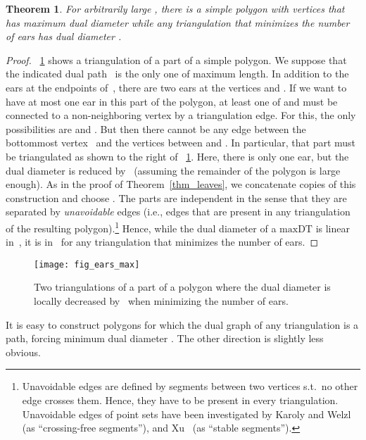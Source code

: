 \documentclass{article}
\newcommand{\MaxDT}{\ensuremath{\mathrm{maxDT}}}
\newtheorem{theorem}{Theorem}[section]
\begin{document}
\begin{theorem}
For arbitrarily large , there 
is a simple polygon with  vertices that has maximum dual diameter
 while any triangulation
that minimizes the number of 
ears has dual diameter . 
\end{theorem}
\begin{proof}
\figurename~\ref{fig:fig_ears_max} shows a triangulation of a part 
of a simple polygon.
We suppose that the indicated dual path~ is the only one of maximum 
length.
In addition to the ears at the endpoints of~, there are two ears at 
the vertices  and .
If we want to have at most one ear in this part of the polygon,
at least one of  and  must be connected to a 
non-neighboring vertex by a triangulation edge.
For this, the only possibilities are  and .
But then there cannot be any edge between the bottommost vertex~ 
and the  vertices between  and .
In particular, that part must be triangulated as shown to the right 
of \figurename~\ref{fig:fig_ears_max}.
Here, there is only one ear, but the dual diameter is reduced 
by~ (assuming the remainder of the polygon is large enough).
As in the proof of Theorem~\ref{thm_leaves}, we concatenate 
 copies of this construction and choose 
.
The parts are independent in the sense that they are separated by 
\emph{unavoidable} edges (i.e., edges that are present in any 
triangulation of the resulting polygon).\footnote{Unavoidable edges are defined by segments between two vertices s.t.\ no other edge crosses them.
Hence, they have to be present in every triangulation.
Unavoidable edges of point sets have been investigated by Karoly and Welzl~\cite{karolyi_welzl} (as ``crossing-free segments''), and Xu~\cite{xu} (as ``stable segments'').}
Hence, while the dual diameter of a \MaxDT{} is linear in~, it is 
in~ for any triangulation that minimizes the number of ears.
\end{proof}

\begin{figure}
\centering
\texttt{[image: fig\_ears\_max]}
\caption{Two triangulations of a part of a polygon where the dual diameter is locally decreased by~ when minimizing the number of ears.}
\label{fig:fig_ears_max}
\end{figure}


It is easy to construct polygons for which the dual graph of any 
triangulation is a path, forcing minimum dual diameter .
The other direction is slightly less obvious.
\end{document}
